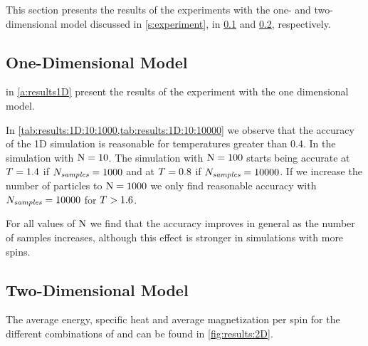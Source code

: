 This section presents the results of the experiments with the one- and two- dimensional model discussed in \cref{s:experiment}, in \cref{ss:results:1D} and \cref{ss:results:2D}, respectively.

\subsection{One-Dimensional Model}
\label{ss:results:1D}
	 in \cref{a:results1D} present the results of the experiment with the one dimensional model.

	In \cref{tab:results:1D:10:1000,tab:results:1D:10:10000} we observe that the accuracy of the 1D simulation is reasonable for temperatures greater than 0.4. In the simulation with $\mathrm{N} = 10$. 
	The simulation with $\mathrm{N} = 100$ starts being accurate at $T = 1.4$ if $N_\textit{samples} = 1000$ and at $T = 0.8$ if $N_\textit{samples} = 10000$. 
	If we increase the number of particles to $\mathrm{N} = 1000$ we only find reasonable accuracy with $N_\textit{samples} = 10000$ for $T > 1.6$.

	For all values of $\mathrm{N}$ we find that the accuracy improves in general as the number of samples increases, although this effect is stronger in simulations with more spins.

\subsection{Two-Dimensional Model}
\label{ss:results:2D}
	The average energy, specific heat and average magnetization per spin for the different combinations of \numberOfSpins and \numberOfSamples can be found in \cref{fig:results:2D}. 

